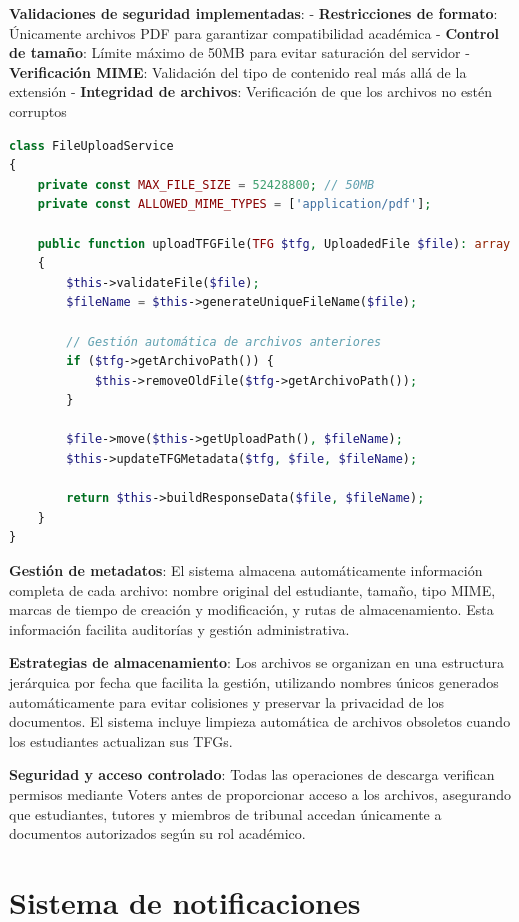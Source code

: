 \documentclass[12pt,a4paper,oneside]{report}
\begin{document}
\textbf{Validaciones de seguridad implementadas}:
- \textbf{Restricciones de formato}: Únicamente archivos PDF para garantizar compatibilidad académica
- \textbf{Control de tamaño}: Límite máximo de 50MB para evitar saturación del servidor
- \textbf{Verificación MIME}: Validación del tipo de contenido real más allá de la extensión
- \textbf{Integridad de archivos}: Verificación de que los archivos no estén corruptos

\begin{lstlisting}[language=PHP]
class FileUploadService
{
    private const MAX_FILE_SIZE = 52428800; // 50MB
    private const ALLOWED_MIME_TYPES = ['application/pdf'];

    public function uploadTFGFile(TFG $tfg, UploadedFile $file): array
    {
        $this->validateFile($file);
        $fileName = $this->generateUniqueFileName($file);

        // Gestión automática de archivos anteriores
        if ($tfg->getArchivoPath()) {
            $this->removeOldFile($tfg->getArchivoPath());
        }

        $file->move($this->getUploadPath(), $fileName);
        $this->updateTFGMetadata($tfg, $file, $fileName);

        return $this->buildResponseData($file, $fileName);
    }
}
\end{lstlisting}

\textbf{Gestión de metadatos}: El sistema almacena automáticamente información completa de cada archivo: nombre original del estudiante, tamaño, tipo MIME, marcas de tiempo de creación y modificación, y rutas de almacenamiento. Esta información facilita auditorías y gestión administrativa.

\textbf{Estrategias de almacenamiento}: Los archivos se organizan en una estructura jerárquica por fecha que facilita la gestión, utilizando nombres únicos generados automáticamente para evitar colisiones y preservar la privacidad de los documentos. El sistema incluye limpieza automática de archivos obsoletos cuando los estudiantes actualizan sus TFGs.

\textbf{Seguridad y acceso controlado}: Todas las operaciones de descarga verifican permisos mediante Voters antes de proporcionar acceso a los archivos, asegurando que estudiantes, tutores y miembros de tribunal accedan únicamente a documentos autorizados según su rol académico.

\section{Sistema de notificaciones}\label{sistema-de-notificaciones}
\end{document}
